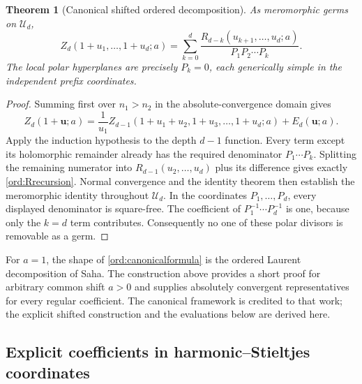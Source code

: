 \documentclass[11pt,letterpaper]{article}
\numberwithin{equation}{section}
\newtheorem{theorem}{Theorem}[section]
\theoremstyle{definition}
\theoremstyle{remark}
\begin{document}
\begin{theorem}[Canonical shifted ordered decomposition]
\label{ord:canonical}
As meromorphic germs on $\mathcal U_d$,
\begin{equation}\label{ord:canonicalformula}
 \boxed{\displaystyle
 Z_d(1+u_1,\ldots,1+u_d;a)
 =\sum_{k=0}^{d}
 \frac{R_{d-k}(u_{k+1},\ldots,u_d;a)}{P_1P_2\cdots P_k}.}
\end{equation}
The local polar hyperplanes are precisely $P_k=0$, each generically
simple in the independent prefix coordinates.
\end{theorem}

\begin{proof}
Summing first over $n_1>n_2$ in the absolute-convergence domain gives
\[
 Z_d(1+\mathbf u;a)
 =\frac1{u_1}Z_{d-1}(1+u_1+u_2,1+u_3,\ldots,1+u_d;a)
       +E_d(\mathbf u;a).
\]
Apply the induction hypothesis to the depth $d-1$ function. Every term
except its holomorphic remainder already has the required denominator
$P_1\cdots P_k$. Splitting the remaining numerator into
$R_{d-1}(u_2,\ldots,u_d)$ plus its difference gives exactly
\eqref{ord:Rrecursion}. Normal convergence and the identity theorem then
establish the meromorphic identity throughout $\mathcal U_d$.
In the coordinates $P_1,\ldots,P_d$, every displayed denominator is
square-free. The coefficient of $P_1^{-1}\cdots P_d^{-1}$ is one,
because only the $k=d$ term contributes. Consequently no one of these
polar divisors is removable as a germ.
\end{proof}

For $a=1$, the shape of \eqref{ord:canonicalformula} is the ordered
Laurent decomposition of Saha\cite[Theorem 2]{Saha}. The construction above
provides a short proof for arbitrary common shift $a>0$ and supplies
absolutely convergent representatives for every regular coefficient.
The canonical framework is credited to that work; the explicit shifted
construction and the evaluations below are derived here.

\subsection{Explicit coefficients in harmonic--Stieltjes coordinates}
\end{document}
